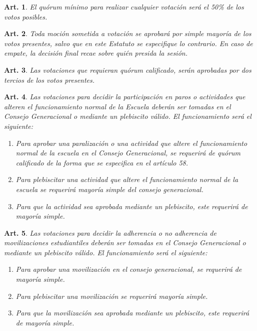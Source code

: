 \documentclass[letterpaper,11pt]{article}
\theoremstyle{plain}
\newtheorem{art}{Art.} %
\begin{document}
			\begin{art}\label{quorumMinimoVotacion}
				El quórum mínimo para realizar cualquier votación será el 50\% de los votos posibles.
			\end{art}

			\begin{art}\label{esquemaVotacion}
				Toda moción sometida a votación se aprobará por simple mayoría de los votos presentes, salvo que en este Estatuto se especifique lo contrario. En caso de empate, la decisión final recae sobre quién presida la sesión.
			\end{art}

			\begin{art}\label{quorumCalificado}
				Las votaciones que requieran quórum calificado, serán aprobadas por dos tercios de los votos presentes.
			\end{art}

			\begin{art}\label{votacionParo}
				Las votaciones para decidir la participación en paros o actividades que alteren el funcionamiento normal de la Escuela deberán ser tomadas en el Consejo Generacional o mediante un plebiscito válido. El funcionamiento será el siguiente:
				\begin{enumerate}
					\item Para aprobar una paralización o una actividad que altere el funcionamiento normal de la escuela en el Consejo Generacional, se requerirá de quórum calificado de la forma que se especifica en el artículo 58.
					\item Para plebiscitar una actividad que altere el funcionamiento normal de la escuela se requerirá mayoría simple del consejo generacional.
					\item Para que la actividad sea aprobada mediante un plebiscito, este requerirá de mayoría simple.
				\end{enumerate}
			\end{art}

			\begin{art}\label{votacionMovilizacion}
				Las votaciones para decidir la adherencia o no adherencia de movilizaciones estudiantiles deberán ser tomadas en el Consejo Generacional o mediante un plebiscito válido. El funcionamiento será el siguiente:
				\begin{enumerate}
					\item Para aprobar una movilización en el consejo generacional, se requerirá de mayoría simple.
					\item Para plebiscitar una movilización se requerirá mayoría simple.
					\item Para que la movilización sea aprobada mediante un plebiscito, este requerirá de mayoría simple.
				\end{enumerate}
			\end{art}
\end{document}
